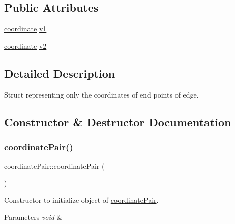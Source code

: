 \subsection*{Public Attributes}
\begin{DoxyCompactItemize}
\item 
\mbox{\hyperlink{structcoordinate}{coordinate}} \mbox{\hyperlink{structcoordinate_pair_ad20aa480a259a5ba0c670665c83371e2}{v1}}
\item 
\mbox{\hyperlink{structcoordinate}{coordinate}} \mbox{\hyperlink{structcoordinate_pair_a204dda11b9a29fd8d5967987253064b2}{v2}}
\end{DoxyCompactItemize}


\subsection{Detailed Description}
Struct representing only the coordinates of end points of edge. 

\subsection{Constructor \& Destructor Documentation}
\mbox{\label{structcoordinate_pair_aff1046f3c8d962d58ad159f5b2d8c66e}} 
\subsubsection{\texorpdfstring{coordinate\+Pair()}{coordinatePair()}\hspace{0.1cm}{\footnotesize\ttfamily [1/3]}}
{\footnotesize\ttfamily coordinate\+Pair\+::coordinate\+Pair (\begin{DoxyParamCaption}{ }\end{DoxyParamCaption})}



Constructor to initialize object of \mbox{\hyperlink{structcoordinate_pair}{coordinate\+Pair}}. 


\begin{DoxyParams}{Parameters}
{\em void} & \\
\hline
\end{DoxyParams}
\mbox{\label{structcoordinate_pair_a382dba7c330a0a050600f52ee2f16df1}} 
